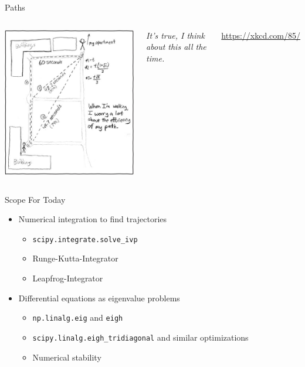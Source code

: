 
\begin{frame}[t,plain]
\titlepage
\end{frame}


\begin{frame}{Paths}
%
\begin{columns}
\begin{center}
\includegraphics[width=0.6\linewidth]{./gfx/04-xkcd-paths}\\
\end{center}
%
\small
	\emph{It's true, I think about this all the time.}

	\vspace{6pt}
	\url{https://xkcd.com/85/}
\end{columns}
%
\end{frame}


\begin{frame}{Scope For Today}
%
\begin{itemize}
\item Numerical integration to find trajectories
	\begin{itemize}
	\item \texttt{scipy.integrate.solve\_ivp}
	\item Runge-Kutta-Integrator
	\item Leapfrog-Integrator
	\end{itemize}
\item Differential equations as eigenvalue problems
	\begin{itemize}
	\item \texttt{np.linalg.eig} and \texttt{eigh}
	\item \texttt{scipy.linalg.eigh\_tridiagonal} and similar optimizations
	\item Numerical stability
	\end{itemize}
\end{itemize}
%
\end{frame}

